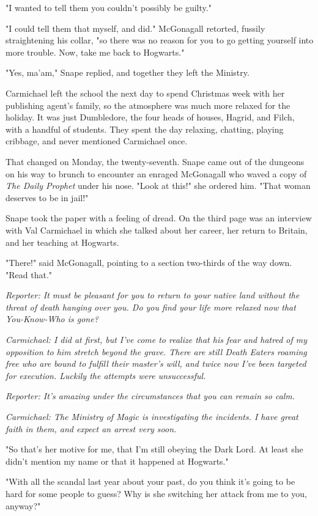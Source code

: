 \documentclass[a4paper,11pt]{article}
\begin{document}
"I wanted to tell them you couldn't possibly be guilty."

"I could tell them that myself, and did." McGonagall retorted, fussily straightening his collar, "so there was no reason for you to go getting yourself into more trouble. Now, take me back to Hogwarts."

"Yes, ma'am," Snape replied, and together they left the Ministry.

Carmichael left the school the next day to spend Christmas week with her publishing agent's family, so the atmosphere was much more relaxed for the holiday. It was just Dumbledore, the four heads of houses, Hagrid, and Filch, with a handful of students. They spent the day relaxing, chatting, playing cribbage, and never mentioned Carmichael once.

That changed on Monday, the twenty-seventh. Snape came out of the dungeons on his way to brunch to encounter an enraged McGonagall who waved a copy of \emph{The Daily Prophet} under his nose. "Look at this!" she ordered him. "That woman deserves to be in jail!"

Snape took the paper with a feeling of dread. On the third page was an interview with Val Carmichael in which she talked about her career, her return to Britain, and her teaching at Hogwarts.

"There!" said McGonagall, pointing to a section two-thirds of the way down. "Read that."

\emph{Reporter: It must be pleasant for you to return to your native land without the threat of death hanging over you. Do you find your life more relaxed now that You-Know-Who is gone?}

\emph{Carmichael: I did at first, but I've come to realize that his fear and hatred of my opposition to him stretch beyond the grave. There are still Death Eaters roaming free who are bound to fulfill their master's will, and twice now I've been targeted for execution. Luckily the attempts were unsuccessful.}

\emph{Reporter: It's amazing under the circumstances that you can remain so calm.}

\emph{Carmichael: The Ministry of Magic is investigating the incidents. I have great faith in them, and expect an arrest very soon.}

"So that's her motive for me, that I'm still obeying the Dark Lord. At least she didn't mention my name or that it happened at Hogwarts."

"With all the scandal last year about your past, do you think it's going to be hard for some people to guess? Why is she switching her attack from me to you, anyway?"
\end{document}
